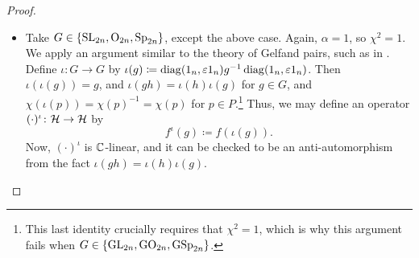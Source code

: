 \begin{proof}
\begin{itemize}
        \item Take $G\in\{\mathrm{SL}_{2n},\mathrm{O}_{2n},\mathrm{Sp}_{2n}\}$, except the above case. Again, $\alpha=1$, so $\chi^2=1$. We apply an argument similar to the theory of Gelfand pairs, such as in \cite[Theorem~45.2]{bump-lie-group}. Define $\iota\colon G\to G$ by $\iota(g)\coloneqq\operatorname{diag}(1_n,\varepsilon1_n)g^{-1}\operatorname{diag}(1_n,\varepsilon1_n)$. Then $\iota(\iota(g))=g$, and $\iota(gh)=\iota(h)\iota(g)$ for $g\in G$, and $\chi(\iota(p))=\chi(p)^{-1}=\chi(p)$ for $p\in P$.\footnote{This last identity crucially requires that $\chi^2=1$, which is why this argument fails when $G\in\{{\operatorname{GL}_{2n}},{\operatorname{GO}_{2n}},{\operatorname{GSp}_{2n}}\}$.}
        Thus, we may define an operator $(\cdot)^\iota\colon\mathcal{H}\to\mathcal{H}$ by
        \[f^\iota(g)\coloneqq f(\iota(g)).\]
        Now, $(\cdot)^\iota$ is $\mathbb C$-linear, and it can be checked to be an anti-automorphism from the fact $\iota(gh)=\iota(h)\iota(g)$.
        

\end{itemize}
\end{proof}
